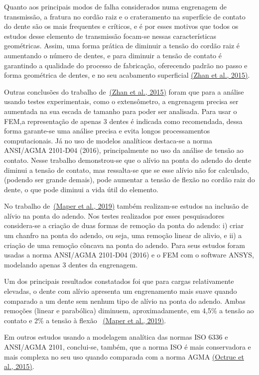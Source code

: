 \documentclass[12pt,a4paper]{article}
\begin{document}
Quanto aos principais modos de falha considerados numa engrenagem de
transmissão, a fratura no cordão raiz e o crateramento na superfície de
contato do dente são os mais frequentes e críticos, e é por esses
motivos que todos os estudos desse elemento de transmissão focam-se
nessas características geométricas. Assim, uma forma prática de diminuir
a tensão do cordão raiz é aumentando o número de dentes, e para diminuir
a tensão de contato é garantindo a qualidade do processo de fabricação,
oferecendo padrão no passo e forma geométrica de dentes, e no seu
acabamento superficial \hyperref[csl:11]{(Zhan et al., 2015)}.

Outras conclusões do trabalho de~\hyperref[csl:11]{(Zhan et al., 2015)} foram que para a análise usando testes experimentais, como o extensômetro, a engrenagem
precisa ser aumentada na sua escada de tamanho para poder ser analisada.
Para usar o FEM,a representação de apenas 3 dentes é indicada como
recomendada, dessa forma garante-se uma análise precisa e evita longos
processamentos computacionais. Já no uso de modelos analíticos
destaca-se a norma ANSI/AGMA 2101-D04 (2016), principalmente no uso da
análise de tensão ao contato. Nesse trabalho demonstrou-se que o alívio
na ponta do adendo do dente diminui a tensão de contato, mas ressalta-se
que se esse alívio não for calculado, (podendo ser grande demais), pode
aumentar a tensão de flexão no cordão raiz do dente, o que pode diminui
a vida útil do elemento.

No trabalho de~\hyperref[csl:12]{(Maper et al., 2019)} também realizam-se estudos na
inclusão de alívio na ponta do adendo. Nos testes realizados por esses
pesquisadores considera-se a criação de duas formas de remoção da ponta
do adendo: i) criar um chanfro na ponta do adendo, ou seja, uma remoção
linear de alivio, e ii) a criação de uma remoção côncava na ponta do
adendo. Para seus estudos foram usadas a norma ANSI/AGMA 2101-D04 (2016)
e o FEM com o software ANSYS, modelando apenas 3 dentes da engrenagem.

Um dos principais resultados constatados foi que para cargas
relativamente elevadas, o dente com alívio apresenta um engrenamento
mais suave quando comparado a um dente sem nenhum tipo de alívio na
ponta do adendo. Ambas remoções (linear e parabólica) diminuem,
aproximadamente, em 4,5\% a tensão ao contato e 2\% a tensão à flexão
~\hyperref[csl:12]{(Maper et al., 2019)}.

Em outros estudos usando a modelagem analítica das normas ISO 6336 e
ANSI/AGMA 2101, conclui-se, também, que a norma ISO é mais conservadora
e mais complexa no seu uso quando comparada com a norma AGMA
\hyperref[csl:13]{(Octrue et al., 2015)}.
\end{document}
